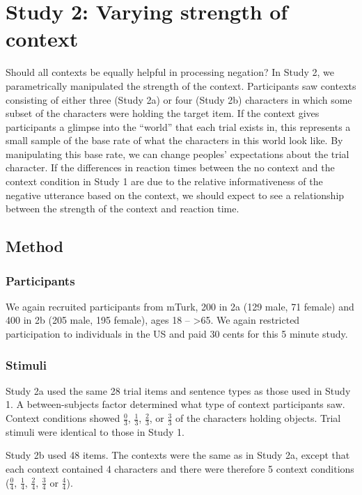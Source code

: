 \documentclass[10pt,letterpaper]{article}
\begin{document}
\section{Study 2: Varying strength of context}

Should all contexts be equally helpful in processing negation? In Study 2, we parametrically manipulated the strength of the context.  Participants saw contexts consisting of either three (Study 2a) or four (Study 2b) characters in which some subset of the characters were holding the target item.  If the context gives participants a glimpse into the ``world'' that each trial exists in, this represents a small sample of the base rate of what the characters in this world look like.  By manipulating this base rate, we can change peoples' expectations about the trial character.  If the differences in reaction times between the no context and the context condition in Study 1 are due to the relative informativeness of the negative utterance based on the context, we should expect to see a relationship between the strength of the context and reaction time. 

\subsection{Method}

\subsubsection{Participants} 

We again recruited participants from mTurk, 200 in 2a (129 male, 71 female) and  400 in 2b (205 male, 195 female), ages 18 -- \textgreater65. We again restricted participation to individuals in the US and paid 30 cents for this 5 minute study.  

\subsubsection{Stimuli}

Study 2a used the same 28 trial items and sentence types as those used in Study 1.  A between-subjects factor determined what type of context participants saw.  Context conditions showed $\frac{0}{3}$, $\frac{1}{3}$, $\frac{2}{3}$, or $\frac{3}{3}$ of the characters holding objects.  Trial stimuli were identical to those in Study 1.  

Study 2b used 48 items.  The contexts were the same as in Study 2a, except that each context contained 4 characters and there were therefore 5 context conditions ($\frac{0}{4}$, $\frac{1}{4}$, $\frac{2}{4}$, $\frac{3}{4}$ or $\frac{4}{4}$).  
\end{document}

